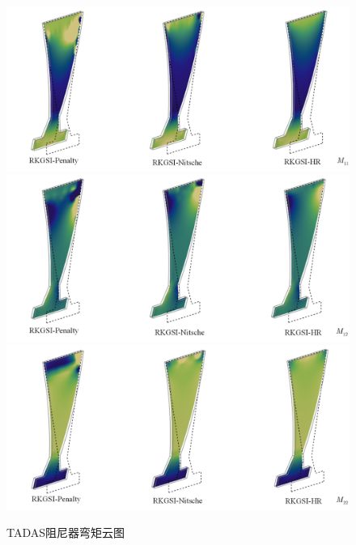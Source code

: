 \begin{figure}[H]
    \centering
    \includegraphics[scale=0.5]{figure/DAMPER/TADAS/M11.png}\\
    \includegraphics[scale=0.5]{figure/DAMPER/TADAS/M12.png}\\
    \includegraphics[scale=0.5]{figure/DAMPER/TADAS/M22.png}
    \caption{TADAS阻尼器弯矩云图}\label{TADAS4}
\end{figure}
